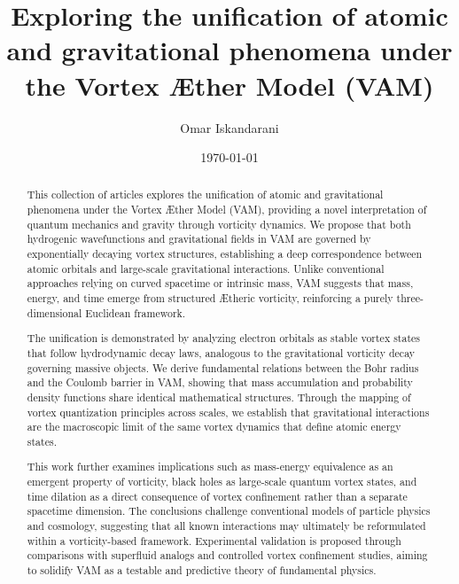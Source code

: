 \documentclass[a4paper,10pt]{article}
\title{Exploring the unification of atomic and gravitational phenomena under the Vortex \AE ther Model (VAM)}
\author{Omar Iskandarani}
\date{\today}
\begin{document}
    \maketitle

    \maketitle

    \begin{abstract}

This collection of articles explores the unification of atomic and gravitational phenomena under the Vortex \AE ther Model (VAM), providing a novel interpretation of quantum mechanics and gravity through vorticity dynamics. We propose that both hydrogenic wavefunctions and gravitational fields in VAM are governed by exponentially decaying vortex structures, establishing a deep correspondence between atomic orbitals and large-scale gravitational interactions. Unlike conventional approaches relying on curved spacetime or intrinsic mass, VAM suggests that mass, energy, and time emerge from structured \AE theric vorticity, reinforcing a purely three-dimensional Euclidean framework.

The unification is demonstrated by analyzing electron orbitals as stable vortex states that follow hydrodynamic decay laws, analogous to the gravitational vorticity decay governing massive objects. We derive fundamental relations between the Bohr radius and the Coulomb barrier in VAM, showing that mass accumulation and probability density functions share identical mathematical structures. Through the mapping of vortex quantization principles across scales, we establish that gravitational interactions are the macroscopic limit of the same vortex dynamics that define atomic energy states.

This work further examines implications such as mass-energy equivalence as an emergent property of vorticity, black holes as large-scale quantum vortex states, and time dilation as a direct consequence of vortex confinement rather than a separate spacetime dimension. The conclusions challenge conventional models of particle physics and cosmology, suggesting that all known interactions may ultimately be reformulated within a vorticity-based framework. Experimental validation is proposed through comparisons with superfluid analogs and controlled vortex confinement studies, aiming to solidify VAM as a testable and predictive theory of fundamental physics.



    \end{abstract}
\end{document}
